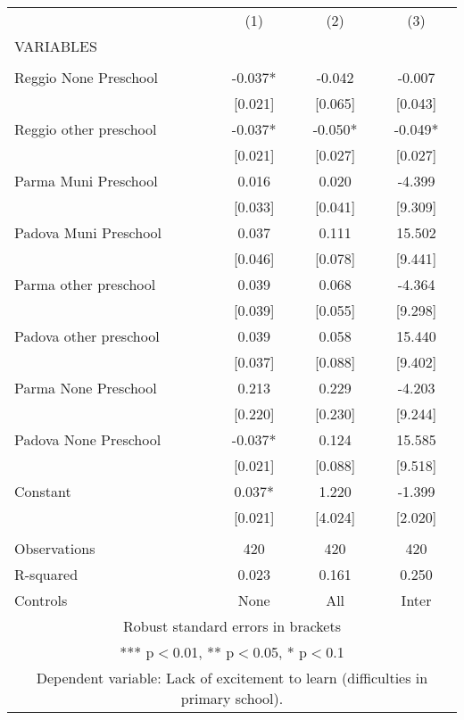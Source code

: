 \begin{tabular}{lccc} \hline
 & (1) & (2) & (3) \\
VARIABLES &  &  &  \\ \hline
 &  &  &  \\
Reggio None Preschool & -0.037* & -0.042 & -0.007 \\
 & [0.021] & [0.065] & [0.043] \\
Reggio other preschool & -0.037* & -0.050* & -0.049* \\
 & [0.021] & [0.027] & [0.027] \\
Parma Muni Preschool & 0.016 & 0.020 & -4.399 \\
 & [0.033] & [0.041] & [9.309] \\
Padova Muni Preschool & 0.037 & 0.111 & 15.502 \\
 & [0.046] & [0.078] & [9.441] \\
Parma other preschool & 0.039 & 0.068 & -4.364 \\
 & [0.039] & [0.055] & [9.298] \\
Padova other preschool & 0.039 & 0.058 & 15.440 \\
 & [0.037] & [0.088] & [9.402] \\
Parma None Preschool & 0.213 & 0.229 & -4.203 \\
 & [0.220] & [0.230] & [9.244] \\
Padova None Preschool & -0.037* & 0.124 & 15.585 \\
 & [0.021] & [0.088] & [9.518] \\
Constant & 0.037* & 1.220 & -1.399 \\
 & [0.021] & [4.024] & [2.020] \\
 &  &  &  \\
Observations & 420 & 420 & 420 \\
R-squared & 0.023 & 0.161 & 0.250 \\
 Controls & None & All & Inter \\ \hline
\multicolumn{4}{c}{ Robust standard errors in brackets} \\
\multicolumn{4}{c}{ *** p$<$0.01, ** p$<$0.05, * p$<$0.1} \\
\multicolumn{4}{c}{ Dependent variable: Lack of excitement to learn (difficulties in primary school).} \\
\end{tabular}
